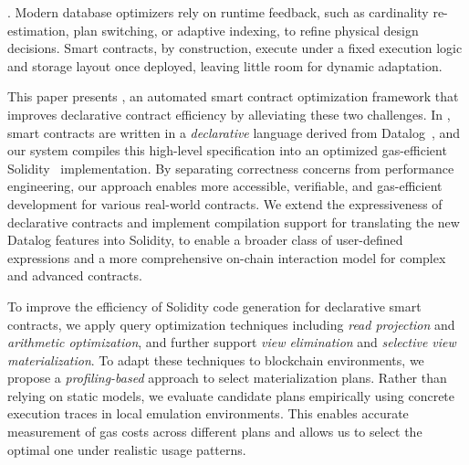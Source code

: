 .
Modern database optimizers rely on runtime feedback, such as cardinality re-estimation, plan switching, or adaptive indexing, to refine physical design decisions. Smart contracts, by construction, execute under a fixed execution logic and storage layout once deployed, leaving little room for dynamic adaptation.


This paper presents {\em \proto}, an automated smart contract optimization framework that improves declarative contract efficiency by alleviating these two challenges.
In {\em \proto}, smart contracts are written in a \emph{declarative} language derived from Datalog~\cite{maier2018datalog, ceri1989you}, and our system compiles this high-level specification into an optimized gas-efficient Solidity~\cite{solidity} implementation. By separating correctness concerns from performance engineering, our approach enables more accessible, verifiable, and gas-efficient development for various real-world contracts.
We extend the expressiveness of declarative contracts and implement compilation support for translating the new Datalog features into Solidity, to enable a broader class of user-defined expressions and a more comprehensive on-chain interaction model for complex and advanced contracts.

To improve the efficiency of Solidity code generation for declarative smart contracts, we apply query optimization techniques including \emph{read projection} and \emph{arithmetic optimization}, and further support \emph{view elimination} and \emph{selective view materialization}.
To adapt these techniques to blockchain environments, we propose a \emph{profiling-based} approach to select materialization plans. Rather than relying on static models, we evaluate candidate plans empirically using concrete execution traces in local emulation environments. This enables accurate measurement of gas costs across different plans and allows us to select the optimal one under realistic usage patterns.

